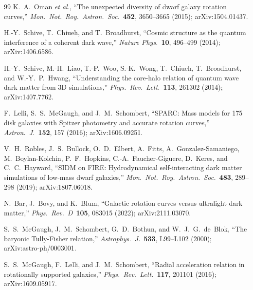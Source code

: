 \documentclass[11pt,a4paper]{article}
\theoremstyle{definition}
\theoremstyle{remark}
\begin{document}
\begin{thebibliography}{99}
K.~A.~Oman \emph{et al.},
``The unexpected diversity of dwarf galaxy rotation curves,''
\emph{Mon.\ Not.\ Roy.\ Astron.\ Soc.}\ \textbf{452}, 3650--3665 (2015);
arXiv:1504.01437.


H.-Y.~Schive, T.~Chiueh, and T.~Broadhurst,
``Cosmic structure as the quantum interference of a coherent dark wave,''
\emph{Nature Phys.}\ \textbf{10}, 496--499 (2014);
arXiv:1406.6586.

H.-Y.~Schive, M.-H.~Liao, T.-P.~Woo, S.-K.~Wong, T.~Chiueh, T.~Broadhurst, and W.-Y.~P.~Hwang,
``Understanding the core-halo relation of quantum wave dark matter from 3D simulations,''
\emph{Phys.\ Rev.\ Lett.}\ \textbf{113}, 261302 (2014);
arXiv:1407.7762.


F.~Lelli, S.~S.~McGaugh, and J.~M.~Schombert,
``SPARC: Mass models for 175 disk galaxies with Spitzer photometry and accurate rotation curves,''
\emph{Astron.\ J.}\ \textbf{152}, 157 (2016);
arXiv:1606.09251.

V.~H.~Robles, J.~S.~Bullock, O.~D.~Elbert, A.~Fitts, A.~Gonzalez-Samaniego, M.~Boylan-Kolchin, P.~F.~Hopkins, C.-A.~Faucher-Giguere, D.~Keres, and C.~C.~Hayward,
``SIDM on FIRE: Hydrodynamical self-interacting dark matter simulations of low-mass dwarf galaxies,''
\emph{Mon.\ Not.\ Roy.\ Astron.\ Soc.}\ \textbf{483}, 289--298 (2019);
arXiv:1807.06018.

N.~Bar, J.~Bovy, and K.~Blum,
``Galactic rotation curves versus ultralight dark matter,''
\emph{Phys.\ Rev.\ D}\ \textbf{105}, 083015 (2022);
arXiv:2111.03070.


S.~S.~McGaugh, J.~M.~Schombert, G.~D.~Bothun, and W.~J.~G.~de~Blok,
``The baryonic Tully-Fisher relation,''
\emph{Astrophys.\ J.}\ \textbf{533}, L99--L102 (2000);
arXiv:astro-ph/0003001.

S.~S.~McGaugh, F.~Lelli, and J.~M.~Schombert,
``Radial acceleration relation in rotationally supported galaxies,''
\emph{Phys.\ Rev.\ Lett.}\ \textbf{117}, 201101 (2016);
arXiv:1609.05917.



\end{thebibliography}
\end{document}
